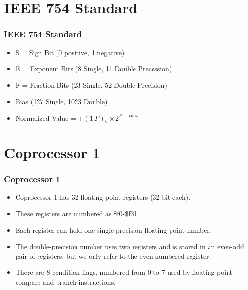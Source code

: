 \documentclass[
	11pt, %
]{beamer}
\begin{document}
\section{IEEE 754 Standard} %
\begin{frame}
	\frametitle{IEEE 754 Standard}
	
	\begin{itemize}
		\item S = Sign Bit (0 positive, 1 negative) \pause
		\item E = Exponent Bits (8 Single, 11 Double Precession)		\pause
		\item F = Fraction Bits (23 Single, 52 Double Precision) 		\pause
		\item Bias (127 Single, 1023 Double)		\pause
		\item Normalized Value = $\pm (1.F)_{2}\times 2^{E-Bias}$
	\end{itemize}
	\begin{table}
		\centering
		\caption{Single-Precession Floating Point}
	\end{table}
	

\end{frame}


\section{Coprocessor 1}
\begin{frame}
	\frametitle{Coprocessor 1}
	\begin{itemize}
		\item Coprocessor 1 has 32 floating-point registers (32 bit each). \pause
		\item These registers are numbered as \color{red}\$f0\color{black}-\color{red}\$f31\color{black}. \pause
		\item Each register can hold one single-precision floating-point number. \pause
		\item The double-precision number uses two registers and is stored in an even-odd pair of registers, but we only refer to the even-numbered register. \pause
		\item There are 8 condition flags, numbered from 0 to 7 used by floating-point compare and branch instructions. 
	\end{itemize}
	
\end{frame}
\end{document}
